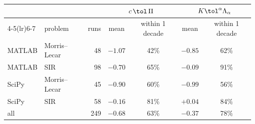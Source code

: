 \begin{tabular}{llrcccc}
\toprule
& & & \multicolumn{2}{c}{$c\,\tol\,\Pi$} & \multicolumn{2}{c}{$K\tol^\alpha\Lambda_\alpha$}\\
\cmidrule(lr){4-5}\cmidrule(lr){6-7}
& problem & runs & mean & within 1 decade & mean & within 1 decade\\
\midrule
MATLAB & Morris--Lecar & 48 & $-1.07$ & 42\% & $-0.85$ & 62\%\\
MATLAB & SIR & 98 & $-0.70$ & 65\% & $-0.09$ & 91\%\\
SciPy & Morris--Lecar & 45 & $-0.90$ & 60\% & $-0.99$ & 56\%\\
SciPy & SIR & 58 & $-0.16$ & 81\% & $+0.04$ & 84\%\\
\midrule
all & & 249 & $-0.68$ & 63\% & $-0.37$ & 78\%\\
\bottomrule
\end{tabular}
